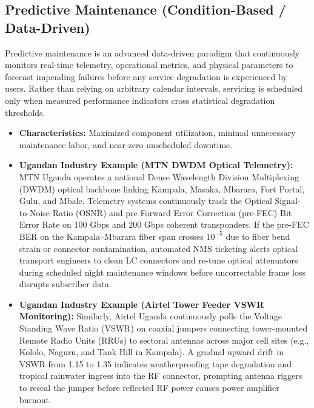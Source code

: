 \documentclass[12pt,a4paper]{report}
\begin{document}
\subsection{Predictive Maintenance (Condition-Based / Data-Driven)}
Predictive maintenance is an advanced data-driven paradigm that continuously monitors real-time telemetry, operational metrics, and physical parameters to forecast impending failures before any service degradation is experienced by users. Rather than relying on arbitrary calendar intervals, servicing is scheduled only when measured performance indicators cross statistical degradation thresholds.
\begin{itemize}
    \item \textbf{Characteristics:} Maximized component utilization, minimal unnecessary maintenance labor, and near-zero unscheduled downtime.
    \item \textbf{Ugandan Industry Example (MTN DWDM Optical Telemetry):} MTN Uganda operates a national Dense Wavelength Division Multiplexing (DWDM) optical backbone linking Kampala, Masaka, Mbarara, Fort Portal, Gulu, and Mbale. Telemetry systems continuously track the Optical Signal-to-Noise Ratio (OSNR) and pre-Forward Error Correction (pre-FEC) Bit Error Rate on 100 Gbps and 200 Gbps coherent transponders. If the pre-FEC BER on the Kampala--Mbarara fiber span crosses $10^{-5}$ due to fiber bend strain or connector contamination, automated NMS ticketing alerts optical transport engineers to clean LC connectors and re-tune optical attenuators during scheduled night maintenance windows before uncorrectable frame loss disrupts subscriber data.
    \item \textbf{Ugandan Industry Example (Airtel Tower Feeder VSWR Monitoring):} Similarly, Airtel Uganda continuously polls the Voltage Standing Wave Ratio (VSWR) on coaxial jumpers connecting tower-mounted Remote Radio Units (RRUs) to sectoral antennas across major cell sites (e.g., Kololo, Naguru, and Tank Hill in Kampala). A gradual upward drift in VSWR from 1.15 to 1.35 indicates weatherproofing tape degradation and tropical rainwater ingress into the RF connector, prompting antenna riggers to reseal the jumper before reflected RF power causes power amplifier burnout.
\end{itemize}
\end{document}
